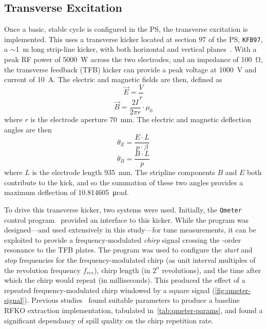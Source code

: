\documentclass[11pt]{report}
\begin{document}
\subsection{Transverse Excitation}\label{sec:trans_exc}
Once a basic, stable cycle is configured in the PS, the transverse excitation is implemented. This uses a transverse kicker located at section 97 of the PS, \verb|KFB97|, a $\sim$\qty{1}{\meter} long strip-line kicker, with both horizontal and vertical planes~\cite{Sterbini:2158994}. With a peak RF power of \qty{5000}{\watt} across the two electrodes, and an impedance of \qty{100}{\ohm}, the transverse feedback (TFB) kicker can provide a peak voltage at \qty{1000}{\volt} and current of \qty{10}{\ampere}. The electric and magnetic fields are then, defined as
\begin{equation}
  \vec E=\frac Vr
\end{equation}
\begin{equation}
  \vec B=\frac {2I}{2\pi r}\cdot \mu_0
\end{equation}
where $r$ is the electrode aperture \qty{70}{\milli\meter}. The electric and magnetic deflection angles are then~\cite[3.1-3.2]{bouvet}
\begin{equation}
  \theta_E = \frac{E \cdot L}{p\cdot\beta}
  \label{eq:kick-electric}
\end{equation}
\begin{equation}
  \theta_B = \frac{B\cdot L}{p}
  \label{eq:kick-magnetic}
\end{equation} where $L$ is the electrode length \qty{935}{\milli\meter}. The stripline components $B$ and $E$ both contribute to the kick, and so the summation of these two angles provides a maximum deflection of \qty{10.814605}{\micro\radian}.

To drive this transverse kicker, two systems were used. Initially, the \verb|Qmeter| control program~\cite{Gasior:895142} provided an interface to this kicker. While the program was designed---and used extensively in this study---for tune measurements, it can be exploited to provide a frequency-modulated \textit{chirp} signal crossing the -order resonance to the TFB plates. The program was used to configure the \textit{start} and \textit{stop} frequencies for the frequency-modulated chirp (as unit interval multiples of the revolution frequency $f_{rev}$), chirp length (in $2^n$ revolutions), and the time after which the chirp would repeat (in milliseconds). This produced the effect of a repeated frequency-modulated chirp windowed by a square signal (\autoref{fig:qmeter-signal}). Previous studies~\cite{ipac} found suitable parameters to produce a baseline RFKO extraction implementation, tabulated in~\autoref{tab:qmeter-params}, and found a significant dependancy of spill quality on the chirp repetition rate.
\end{document}
